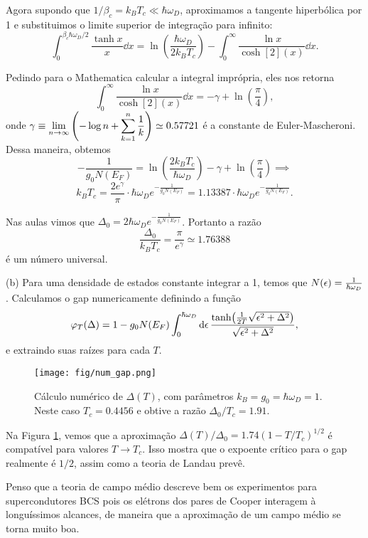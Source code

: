 \documentclass[a4paper,10pt]{article}
\begin{document}
Agora supondo que $1/\beta_c = k_B T_c \ll \hbar \omega_D$, aproximamos a tangente hiperbólica por 1 e substituimos o limite superior de integração para infinito:
$$
\int_0^{\beta_c \hbar \omega_D / 2} \frac{\tanh x}{x} \dd{x} =
\ln (\frac{\hbar \omega_D}{2 k_B T_c}) -
\int_0^{\infty} \frac{\ln x}{\cosh[2](x)} \dd{x}.
$$

Pedindo para o Mathematica calcular a integral imprópria, eles nos retorna
$$
\int_0^{\infty} \frac{\ln x}{\cosh[2](x)} \dd{x} =
- \gamma + \ln(\frac{\pi}{4}),
$$
onde $\displaystyle{\gamma \equiv \lim_{n \to \infty} \qty(-\log n + \sum_{k=1}^{n} \frac{1}{k})} \simeq 0.57721$ é a constante de Euler-Mascheroni. Dessa maneira, obtemos
$$
-\frac{1}{g_0 N(E_F)} = \ln (\frac{2 k_B T_c}{\hbar \omega_D})
- \gamma + \ln(\frac{\pi}{4}) \implies
$$
$$
\boxed{ k_B T_c = \frac{2 e^{\gamma}}{\pi}
\cdot \hbar \omega_D e^{-\frac{1}{g_0 N(E_F)}} =
1.13387 \cdot \hbar \omega_D e^{-\frac{1}{g_0 N(E_F)}}. }
$$

Nas aulas vimos que $\Delta_0 = 2 \hbar \omega_D e^{-\frac{1}{g_0 N(E_F)}}$. Portanto a razão
$$
\frac{\Delta_0}{k_B T_c} = \frac{\pi}{e^{\gamma}} \simeq 1.76388
$$
é um número universal.

\n

(b) Para uma densidade de estados constante integrar a 1, temos que $N(\epsilon) = \frac{1}{\hbar \omega_D}$. Calculamos o gap numericamente definindo a função
$$
\varphi_T(\Delta) =
1 - g_0 N(E_F) \int_{0}^{\hbar \omega_D} \dd{\epsilon}
\frac{\tanh(\frac{1}{2T} \sqrt{\epsilon^2 + \Delta^2})}
{\sqrt{\epsilon^2 + \Delta^2}},
$$
e extraindo suas raízes para cada $T$.

\begin{figure}[H]
\centering
\texttt{[image: fig/num\_gap.png]}
\caption{Cálculo numérico de $\Delta(T)$, com parâmetros $k_B = g_0 = \hbar \omega_D = 1$. Neste caso $T_c = 0.4456$ e obtive a razão $\Delta_0 / T_c = 1.91$.}
\label{fig:num_gap}
\end{figure}

\n

Na Figura \ref{fig:num_gap}, vemos que a aproximação $\Delta(T) / \Delta_0 = 1.74 (1 - T/T_c)^{1/2}$ é compatível para valores $T \to T_c$. Isso mostra que o expoente crítico para o gap realmente é $1/2$, assim como a teoria de Landau prevê.

\n

Penso que a teoria de campo médio descreve bem os experimentos para supercondutores BCS pois os elétrons dos pares de Cooper interagem à longuíssimos alcances, de maneira que a aproximação de um campo médio se torna muito boa.
\end{document}
